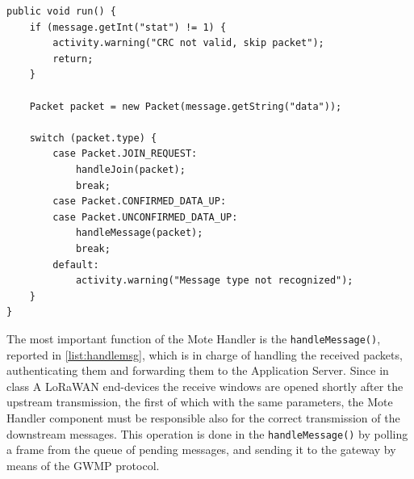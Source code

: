 \begin{lstlisting}[caption=Main function of NetworkServerMoteHandler.java\label{list:motehandler}]
public void run() {
    if (message.getInt("stat") != 1) {
        activity.warning("CRC not valid, skip packet");
        return;
    }

    Packet packet = new Packet(message.getString("data"));

    switch (packet.type) {
        case Packet.JOIN_REQUEST:
            handleJoin(packet);
            break;
        case Packet.CONFIRMED_DATA_UP:
        case Packet.UNCONFIRMED_DATA_UP:
            handleMessage(packet);
            break;
        default:
            activity.warning("Message type not recognized");
    }
}
\end{lstlisting}
The most important function of the Mote Handler is the \texttt{handleMessage()}, reported in \ref{list:handlemsg}, which is in charge of handling the received packets, authenticating them and forwarding them to the Application Server. Since in class A LoRaWAN end-devices the receive windows are opened shortly after the upstream transmission, the first of which with the same parameters, the Mote Handler component must be responsible also for the correct transmission of the downstream messages. This operation is done in the \texttt{handleMessage()} by polling a frame from the queue of pending messages, and sending it to the gateway by means of the GWMP protocol.

